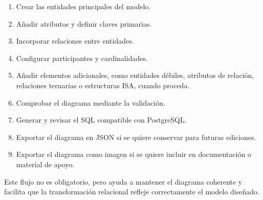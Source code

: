 \begin{enumerate}
    \item Crear las entidades principales del modelo.
    \item Añadir atributos y definir claves primarias.
    \item Incorporar relaciones entre entidades.
    \item Configurar participantes y cardinalidades.
    \item Añadir elementos adicionales, como entidades débiles, atributos de relación, relaciones ternarias o estructuras ISA, cuando proceda.
    \item Comprobar el diagrama mediante la validación.
    \item Generar y revisar el SQL compatible con PostgreSQL.
    \item Exportar el diagrama en JSON si se quiere conservar para futuras ediciones.
    \item Exportar el diagrama como imagen si se quiere incluir en documentación o material de apoyo.
\end{enumerate}

Este flujo no es obligatorio, pero ayuda a mantener el diagrama coherente y facilita que la transformación relacional refleje correctamente el modelo diseñado.

